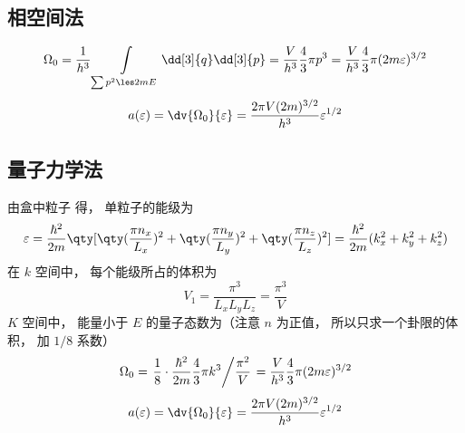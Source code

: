 
\subsection{相空间法}
\begin{equation}
\Omega_0 = \frac{1}{h^3}\int\limits_{\sum {p^2}  \les 2mE} \dd[3]{q} \dd[3]{p}
 = \frac{V}{h^3}\frac43 \pi {p^3}
 = \frac{V}{h^3}\frac43 \pi (2m\varepsilon)^{3/2}
\end{equation}
\begin{equation}
a(\varepsilon) = \dv{\Omega_0}{\varepsilon} = \frac{2\pi V(2m)^{3/2}}{h^3} \varepsilon^{1/2}
\end{equation}

\subsection{量子力学法}
由盒中粒子%
得， 单粒子的能级为
\begin{equation}
\varepsilon = \frac{\hbar ^2}{2m} \qty[\qty(\frac{\pi n_x}{L_x})^2 + \qty(\frac{\pi n_y}{L_y})^2 + \qty(\frac{\pi n_z}{L_z})^2] = \frac{\hbar ^2}{2m} (k_x^2 + k_y^2 + k_z^2)
\end{equation}
在 $k$ 空间中， 每个能级所占的体积为
\begin{equation}
V_1 = \frac{\pi^3}{L_x L_y L_z} = \frac{\pi^3}{V}
\end{equation}
$K$ 空间中， 能量小于 $E$ 的量子态数为（注意 $n$ 为正值， 所以只求一个卦限的体积， 加 $1/8$ 系数）
\begin{equation}
\Omega_0 = \left. \frac18\cdot \frac{\hbar^2}{2m}\frac43 \pi k^3 \middle/ \frac{\pi^2}{V} \right. = \frac{V}{h^3}\frac43 \pi(2m\varepsilon)^{3/2}
\end{equation}
\begin{equation}
a(\varepsilon) = \dv{\Omega_0}{\varepsilon} = \frac{2\pi V(2m)^{3/2}}{h^3} \varepsilon^{1/2}
\end{equation}


